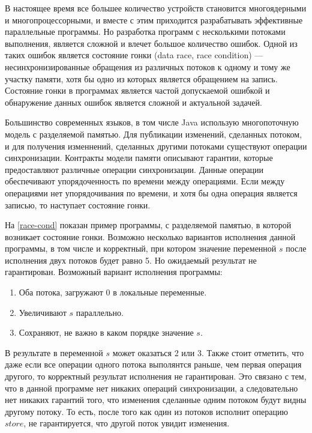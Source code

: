 \startprefacepage

В настоящее время все большее количество устройств становится многоядерными и многопроцессорными, и вместе с этим
приходится разрабатывать эффективные параллельные программы. Но разработка программ с несколькими потоками выполнения, является сложной и влечет большое количество ошибок. Одной из таких ошибок является состояние гонки (data race, race condition) --- несинхронизированные обращения из различных потоков к одному и тому же участку памяти, хотя бы одно из которых является обращением на запись. Состояние гонки в программах является частой допускаемой ошибкой и обнаружение  данных ошибок является сложной и актуальной задачей. 

Большинство современных языков, в том числе Java использую многопоточную модель с разделяемой памятью. Для публикации изменений, сделанных потоком, и для получения изменнений, сделанных другими потоками существуют операции синхронизации.
Контракты модели памяти описывают гарантии, которые предоставляют различные операции синхронизации. Данные операции обеспечивают упорядоченность по времени между операциями. Если между операциями нет упорядочивания по времени, и хотя бы одна операция является записью, то наступает состояние гонки.

На \ref{race-cond} показан пример программы, с разделяемой памятью, в которой возникает состояние гонки.
\FloatBarrier
Возможно несколько вариантов исполнения данной программы, в том числе и корректный, при котором значение переменной $s$ после исполнения двух потоков будет равно 5. Но ожидаемый результат не гарантирован. Возможный вариант исполнения программы: 
\begin{enumerate}
\item Оба потока, загружают 0 в локальные переменные.
\item Увеличивают $s$ параллельно.
\item Сохраняют, не важно в каком порядке значение $s$.
\end{enumerate}
В результате в переменной $s$ может оказаться 2 или 3. Также стоит отметить, что даже если все операции одного потока выполянтся раньше, чем первая операция другого, то корректный результат исполнения не гарантирован. Это связано с тем, что в данной программе нет никаких операций синхронизации, а следовательно нет никаких гарантий того, что изменения сделанные одним потоком будут видны другому потоку. То есть, после того как один из потоков исполнит операцию $store$, не гарантируется, что другой поток увидит изменения.

